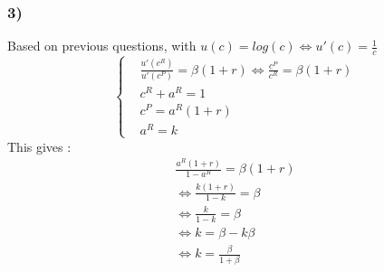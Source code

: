 \documentclass{article}
\begin{document}
\subsubsection{3)}
Based on previous questions, with $u(c)=log(c) \Leftrightarrow u'(c)=\frac{1}{c}$
$$\left\{\begin{aligned}
    &\frac{u'(c^R)}{u'(c^P)}=\beta(1+r)  \Leftrightarrow \frac{c^P}{c^R}=\beta(1+r)\\
    &c^R+a^R=1\\
    &c^P = a^R(1+r)\\
    &a^R=k
\end{aligned} \right.$$
This gives : 
$$\begin{aligned}
    \frac{a^R(1+r)}{1-a^R}=\beta(1+r)\\
    \Leftrightarrow \frac{k(1+r)}{1-k}=\beta\\
    \Leftrightarrow \frac{k}{1-k}=\beta\\
    \Leftrightarrow k = \beta -k\beta\\
    \Leftrightarrow k=\frac{\beta}{1+\beta}
\end{aligned}$$
\end{document}
